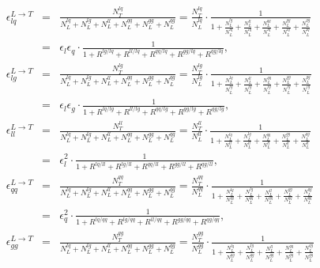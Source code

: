 \begin{eqnarray}
\epsilon_{lq}^{L \rightarrow T} & = & \frac{N_{T}^{lq}}{N_{L}^{lq}+N_{L}^{lg}+N_{L}^{ll}+N_{L}^{qq}+N_{L}^{gg}+N_{L}^{qg}} =
\frac{N_{T}^{lq}}{N_{L}^{lq}} \cdot \frac{1}{1 + \frac{N_{L}^{lg}}{N_{L}^{lq}} + \frac{N_{L}^{ll}}{N_{L}^{lq}} + \frac{N_{L}^{qq}}{N_{L}^{lq}} + \frac{N_{L}^{gg}}{N_{L}^{lq}} + \frac{N_{L}^{qg}}{N_{L}^{lq}}} \nonumber \\
& = & \epsilon_{l} \epsilon_{q} \cdot \frac{1}{1 + R^{lg/lq} + R^{ll/lq} + R^{qq/lq} + R^{gg/lq} + R^{qg/lq}}, \label{eq:eps11_}\\
\epsilon_{lg}^{L \rightarrow T} & = & \frac{N_{T}^{lg}}{N_{L}^{lq}+N_{L}^{lg}+N_{L}^{ll}+N_{L}^{qq}+N_{L}^{gg}+N_{L}^{qg}} =
\frac{N_{T}^{lg}}{N_{L}^{lg}} \cdot \frac{1}{1 + \frac{N_{L}^{lq}}{N_{L}^{lg}} + \frac{N_{L}^{ll}}{N_{L}^{lg}} + \frac{N_{L}^{qq}}{N_{L}^{lg}} + \frac{N_{L}^{gg}}{N_{L}^{lg}} + \frac{N_{L}^{qg}}{N_{L}^{lg}}} \nonumber \\
& = & \epsilon_{l} \epsilon_{g} \cdot \frac{1}{1 + R^{lq/lg} + R^{ll/lg} + R^{qq/lg} + R^{gg/lg} + R^{qg/lg}}, \label{eq:eps12_}\\
\epsilon_{ll}^{L \rightarrow T} & = & \frac{N_{T}^{ll}}{N_{L}^{lq}+N_{L}^{lg}+N_{L}^{ll}+N_{L}^{qq}+N_{L}^{gg}+N_{L}^{qg}} =
\frac{N_{T}^{ll}}{N_{L}^{ll}} \cdot \frac{1}{1 + \frac{N_{L}^{lq}}{N_{L}^{ll}} + \frac{N_{L}^{lg}}{N_{L}^{ll}} + \frac{N_{L}^{qq}}{N_{L}^{ll}} + \frac{N_{L}^{gg}}{N_{L}^{ll}} + \frac{N_{L}^{qg}}{N_{L}^{ll}}} \nonumber \\
& = & \epsilon_{l}^{2} \cdot \frac{1}{1 + R^{lq/ll} + R^{lg/ll} + R^{qq/ll} + R^{gg/ll} + R^{qg/ll}}, \label{eq:eps13_}\\
\epsilon_{qq}^{L \rightarrow T} & = & \frac{N_{T}^{qq}}{N_{L}^{lq}+N_{L}^{lg}+N_{L}^{ll}+N_{L}^{qq}+N_{L}^{gg}+N_{L}^{qg}} =
\frac{N_{T}^{qq}}{N_{L}^{qq}} \cdot \frac{1}{1 + \frac{N_{L}^{lq}}{N_{L}^{qq}} + \frac{N_{L}^{lg}}{N_{L}^{qq}} + \frac{N_{L}^{ll}}{N_{L}^{qq}} + \frac{N_{L}^{gg}}{N_{L}^{qq}} + \frac{N_{L}^{qg}}{N_{L}^{qq}}} \nonumber \\
& = & \epsilon_{q}^{2} \cdot \frac{1}{1 + R^{lq/qq} + R^{lg/qq} + R^{ll/qq} + R^{gg/qq} + R^{qg/qq}}, \label{eq:eps14_}\\
\epsilon_{gg}^{L \rightarrow T} & = & \frac{N_{T}^{gg}}{N_{L}^{lq}+N_{L}^{lg}+N_{L}^{ll}+N_{L}^{qq}+N_{L}^{gg}+N_{L}^{qg}} =
\frac{N_{T}^{gg}}{N_{L}^{gg}} \cdot \frac{1}{1 + \frac{N_{L}^{lq}}{N_{L}^{gg}} + \frac{N_{L}^{lg}}{N_{L}^{gg}} + \frac{N_{L}^{ll}}{N_{L}^{gg}} + \frac{N_{L}^{qq}}{N_{L}^{gg}} + \frac{N_{L}^{qg}}{N_{L}^{gg}}} \nonumber \\

\end{eqnarray}
